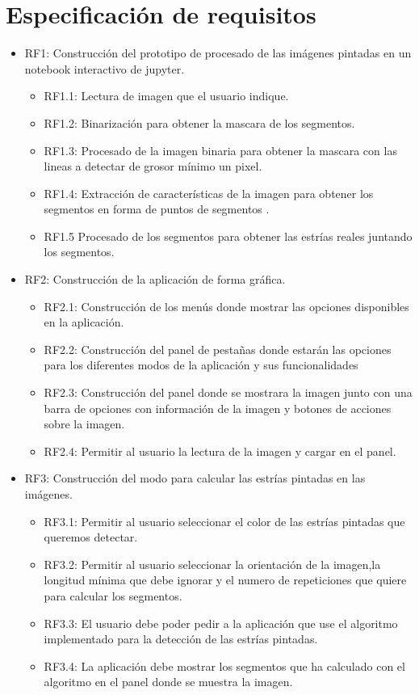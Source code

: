 \section{Especificación de requisitos}
\begin{itemize}
\item RF1: Construcción del prototipo de procesado de las imágenes pintadas en un notebook interactivo de jupyter.
	\begin{itemize}
		\item RF1.1: Lectura de imagen que el usuario indique.
		\item RF1.2: Binarización para obtener la mascara de los segmentos.
		\item RF1.3: Procesado de la imagen binaria para obtener la mascara con las lineas a detectar de grosor mínimo un pixel.
		\item RF1.4: Extracción de características de la imagen para obtener los segmentos en forma de puntos de segmentos .
		\item RF1.5 Procesado de los segmentos para obtener las estrías reales juntando los segmentos.
	\end{itemize}
	 
\item RF2: Construcción de la aplicación de forma gráfica.
	\begin{itemize}
		\item RF2.1: Construcción de los menús donde mostrar las opciones disponibles en la aplicación.
		\item RF2.2: Construcción del panel de pestañas donde estarán las opciones para los diferentes modos de la aplicación y sus funcionalidades
		\item RF2.3: Construcción del panel donde se mostrara la imagen junto con una barra de opciones con información de la imagen y botones de acciones sobre la imagen.
		\item RF2.4: Permitir al usuario la lectura de la imagen y cargar en el panel.
	\end{itemize}


\item RF3: Construcción del modo para calcular las estrías pintadas en las imágenes.
	\begin{itemize}
		\item RF3.1: Permitir al usuario seleccionar el color de las estrías pintadas que queremos detectar.
		\item RF3.2: Permitir al usuario seleccionar la orientación de la imagen,la longitud mínima que debe ignorar y el numero de repeticiones que quiere para calcular los segmentos.
		\item RF3.3: El usuario debe poder pedir a la aplicación que use el algoritmo implementado para la detección de las estrías pintadas.			 
		\item RF3.4: La aplicación debe mostrar los segmentos que ha calculado con el algoritmo en el panel donde se muestra la imagen.
	\end{itemize}


\end{itemize}
